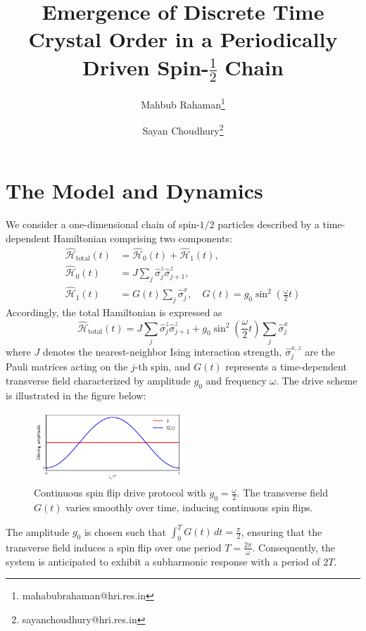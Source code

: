 \documentclass[a4paper, 11pt]{article}
\title{Emergence of Discrete Time Crystal Order in a Periodically Driven Spin-$\frac{1}{2}$ Chain}
\author[1]{Mahbub Rahaman\thanks{mahabubrahaman@hri.res.in}}
\author[1]{Sayan Choudhury\thanks{sayanchoudhury@hri.res.in}}
\affil[1]{\small Harish-Chandra Research Institute, HBNI, Chhatnag Road, Jhunsi, Praygraj, UP - 211019, India}
\date{}
\begin{document}
\maketitle

\section{The Model and Dynamics}
We consider a one-dimensional chain of spin-$1/2$ particles described by a time-dependent Hamiltonian comprising two components:
\begin{align}
    \hat{\mathcal{H}}_{\text{total}}(t) &=  \hat{\mathcal{H}}_0(t) + \hat{\mathcal{H}}_1(t), \\
    \hat{\mathcal{H}}_0(t) &= J\sum_{j} \hat{\sigma}_j^z \hat{\sigma}_{j+1}^z, \\
    \hat{\mathcal{H}}_1(t) &= G(t)\sum_{j}\hat{\sigma}_j^x, \quad G(t) = g_0\sin^2\left(\frac{\omega}{2} t\right)
\end{align}
Accordingly, the total Hamiltonian is expressed as
\begin{equation}
    \boxed{
        \hat{\mathcal{H}}_{\text{total}}(t) =  J\sum_{j} \hat{\sigma}_j^z \hat{\sigma}_{j+1}^z + g_0\sin^2\left(\frac{\omega}{2} t\right)\sum_{j}\hat{\sigma}_j^x
    }
\end{equation}
where $J$ denotes the nearest-neighbor Ising interaction strength, $\hat{\sigma}_j^{x,z}$ are the Pauli matrices acting on the $j$-th spin, and $G(t)$ represents a time-dependent transverse field characterized by amplitude $g_0$ and frequency $\omega$. 
The drive scheme is illustrated in the figure below:
\begin{figure}[h!]
    \centering
    \includegraphics[width=0.5\textwidth]{continuous_flip_drive.pdf}
    \caption{Continuous spin flip drive protocol with $g_0 = \frac{\omega}{2}$. The transverse field $G(t)$ varies smoothly over time, inducing continuous spin flips.}
\end{figure}
The amplitude $g_0$ is chosen such that $\displaystyle \int_0^T G(t)\,dt = \frac{\pi}{2}$, ensuring that the transverse field induces a spin flip over one period $T = \frac{2\pi}{\omega}$. Consequently, the system is anticipated to exhibit a subharmonic response with a period of $2T$.
\end{document}
